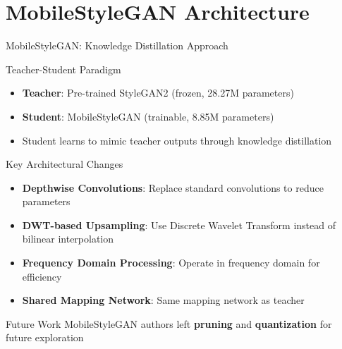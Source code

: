 \documentclass[aspectratio=169,xcolor=dvipsnames]{beamer}
\begin{document}
\section{MobileStyleGAN Architecture}

\begin{frame}{MobileStyleGAN: Knowledge Distillation Approach}
    \begin{block}{Teacher-Student Paradigm}
        \begin{itemize}
            \item \textbf{Teacher}: Pre-trained StyleGAN2 (frozen, 28.27M parameters)
            \item \textbf{Student}: MobileStyleGAN (trainable, 8.85M parameters)
            \item Student learns to mimic teacher outputs through knowledge distillation
        \end{itemize}
    \end{block}
    
    \begin{block}{Key Architectural Changes}
        \begin{itemize}
            \item \textbf{Depthwise Convolutions}: Replace standard convolutions to reduce parameters
            \item \textbf{DWT-based Upsampling}: Use Discrete Wavelet Transform instead of bilinear interpolation
            \item \textbf{Frequency Domain Processing}: Operate in frequency domain for efficiency
            \item \textbf{Shared Mapping Network}: Same mapping network as teacher
        \end{itemize}
    \end{block}
    
    \begin{alertblock}{Future Work}
        MobileStyleGAN authors left \textbf{pruning} and \textbf{quantization} for future exploration
    \end{alertblock}
\end{frame}
\end{document}
